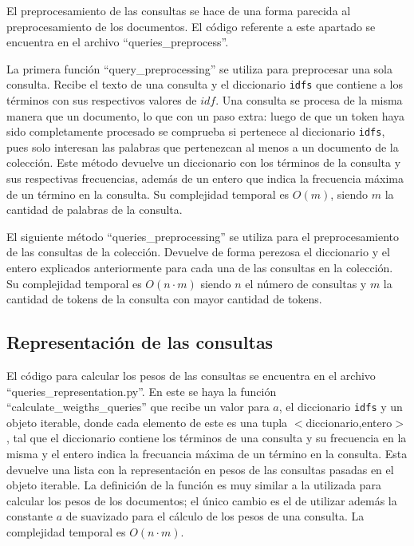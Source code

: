 \documentclass[runningheads]{llncs}
\begin{document}
	El preprocesamiento de las consultas se hace de una forma parecida al preprocesamiento de los documentos. El c\'odigo referente a este apartado se encuentra en el archivo ``queries\_preprocess''.
	
	La primera funci\'on ``query\_preprocessing'' se utiliza para preprocesar una sola consulta. Recibe el texto de una consulta y el diccionario \verb|idfs| que contiene a los t\'erminos con sus respectivos valores de $idf$. Una consulta se procesa de la misma manera que un documento, lo que con un paso extra: luego de que un token haya sido completamente procesado se comprueba si pertenece al diccionario \verb|idfs|, pues solo interesan las palabras que pertenezcan al menos a un documento de la colecci\'on. Este m\'etodo devuelve un diccionario con los t\'erminos de la consulta y sus respectivas frecuencias, adem\'as de un entero que indica la frecuencia m\'axima de un t\'ermino en la consulta. Su complejidad temporal es $O(m)$, siendo $m$ la cantidad de palabras de la consulta. 
	
	El siguiente m\'etodo ``queries\_preprocessing'' se utiliza para el preprocesamiento de las consultas de la colecci\'on. Devuelve de forma perezosa el diccionario y el entero explicados anteriormente para cada una de las consultas en la colecci\'on. Su complejidad temporal es $O(n\cdot m)$ siendo $n$ el n\'umero de consultas y $m$ la cantidad de tokens de la consulta con mayor cantidad de tokens.
	
	\subsection{Representaci\'on de las consultas}
	
	El c\'odigo para calcular los pesos de las consultas se encuentra en el archivo ``queries\_representation.py''. En este se haya la funci\'on ``calculate\_weigths\_queries'' que recibe un valor para $a$, el diccionario \verb|idfs| y un objeto iterable, donde cada elemento de este es una tupla $<$diccionario,entero$>$, tal que el diccionario contiene los t\'erminos de una consulta y su frecuencia en la misma y el entero indica la frecuancia m\'axima de un t\'ermino en la consulta. Esta devuelve una lista con la representaci\'on en pesos de las consultas pasadas en el objeto iterable. La definici\'on de la funci\'on es muy similar a la utilizada para calcular los pesos de los documentos; el \'unico cambio es el de utilizar adem\'as la constante $a$ de suavizado para el c\'alculo de los pesos de una consulta. La complejidad temporal es $O(n\cdot m)$.
	
\end{document}
